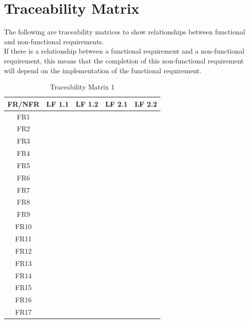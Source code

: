 \documentclass{article}
\begin{document}
\newpage

\section{Traceability Matrix}
\newcommand{\CM}{\checkmark}
The following are traceability matrices to show relationships between
functional and non-functional requirements.\\
If there is a relationship between a functional requirement and a non-functional requirement, 
this means that the completion of this non-functional requirement will depend on the implementation of the functional requirement.

\begin{table}[H]
\centering
\begin{tabular}{|c|c|c|c|c|}
\hline
FR/NFR & LF 1.1 & LF 1.2 & LF 2.1 & LF 2.2 \\ \hline
FR1    & \CM    &        &        &   \CM  \\ \hline
FR2    & \CM    &        &        &        \\ \hline
FR3    & \CM    &        &        &        \\ \hline
FR4    &        &        &        &   \CM  \\ \hline
FR5    & \CM    &   \CM  &        &        \\ \hline
FR6    &        &        &        &   \CM  \\ \hline
FR7    &   \CM  &        &   \CM  &   \CM  \\ \hline
FR8    &   \CM  &        &   \CM  &   \CM  \\ \hline
FR9    &   \CM  &        &   \CM  &   \CM  \\ \hline
FR10   &        &   \CM  &   \CM  &   \CM  \\ \hline
FR11   &   \CM  &   \CM  &        &   \CM  \\ \hline
FR12   &        &        &        &   \CM  \\ \hline
FR13   &        &        &        &        \\ \hline
FR14   &   \CM  &        &        &   \CM  \\ \hline
FR15   &        &        &        &        \\ \hline
FR16   &        &        &        &        \\ \hline
FR17   &        &        &        &   \CM  \\ \hline
\end{tabular}
\caption{Traceability Matrix 1}
\end{table}
\end{document}
